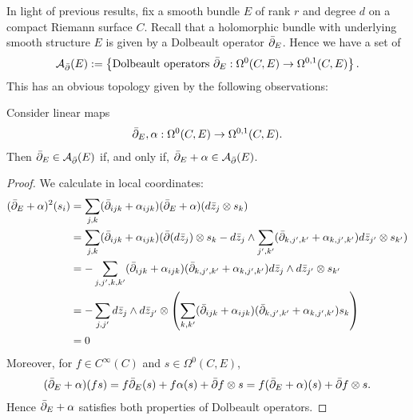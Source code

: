 \documentclass[12pt]{ociamthesis}  %
\begin{document}
In light of previous results, fix a smooth bundle $E$ of rank $r$
and degree $d$ on a compact Riemann surface $C$.
Recall that a holomorphic bundle with underlying smooth structure $E$
is given by a Dolbeault operator ${\bar{\partial}}_E$. Hence we have a set of
\begin{align*}
  \mathcal A_{\bar{\partial}} (E) := \left\lbrace{
    \text{Dolbeault operators ${\bar{\partial}}_E : \Omega^0(C,E) \to \Omega^{0,1}(C,E)$}
  }\right\rbrace.
\end{align*}
This has an obvious topology given by the following observations:
\begin{lemma}\label{lem:affine_space_of_dolbeault_operators}
  Consider linear maps
  \begin{align*}
    {\bar{\partial}}_E,\alpha : \Omega^0(C,E) \to \Omega^{0,1}(C,E).
  \end{align*}
  Then ${\bar{\partial}}_E\in \mathcal A_{\bar{\partial}} (E)$ if, and only if, ${\bar{\partial}}_E+\alpha\in \mathcal A_{\bar{\partial}} (E)$.
  \begin{proof}
    We calculate in local coordinates:
    \begin{align*}
      ({\bar{\partial}}_E + \alpha)^2(s_i)
       & = \sum_{j,k} ({\bar{\partial}}_{ijk} + \alpha_{ijk})({\bar{\partial}}_E + \alpha)( d\bar z_j\otimes s_k)                                                                                     \\
       & = \sum_{j,k} ({\bar{\partial}}_{ijk} + \alpha_{ijk})({\bar{\partial}}(d\bar z_j) \otimes s_k -  d\bar z_j \wedge \sum_{j',k'}({\bar{\partial}}_{k,j',k'} + \alpha_{k,j',k'}) d\bar z_{j'}\otimes s_{k'}) \\
       & = - \sum_{j,j',k,k'} ({\bar{\partial}}_{ijk} + \alpha_{ijk})({\bar{\partial}}_{k,j',k'} + \alpha_{k,j',k'}) d\bar z_j \wedge d\bar z_{j'}\otimes s_{k'}                                      \\
       & = - \sum_{j,j'}
      d\bar z_j \wedge d\bar z_{j'}\otimes \left(
      \sum_{k,k'} ({\bar{\partial}}_{ijk} + \alpha_{ijk})({\bar{\partial}}_{k,j',k'} + \alpha_{k,j',k'}) s_{k}\right)                                                                                 \\
       & = 0
    \end{align*}
    Moreover, for $f\in C^\infty(C)$ and $s\in\Omega^0(C,E)$,
    \begin{align*}
      ({\bar{\partial}}_E + \alpha)(fs) = f{\bar{\partial}}_E(s) + f\alpha(s) + {\bar{\partial}} f \otimes s
      = f({\bar{\partial}}_E+\alpha)(s) + {\bar{\partial}} f \otimes s.
    \end{align*}
    Hence ${\bar{\partial}}_E + \alpha$ satisfies both properties of Dolbeault
    operators.
  \end{proof}
\end{lemma}
\end{document}
